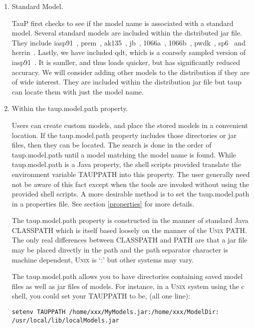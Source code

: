 \begin{enumerate}
\item Standard Model.

TauP first checks to see if the model name is associated with a standard model.
Several standard models are included within the distributed jar file. 
They include 
iasp91~\cite{iasp}, 
prem~\cite{dziewonski_anderson}, 
ak135~\cite{kennett:ak135}, 
jb~\cite{jb}, 
1066a~\cite{gilbert_dziewonski}, 
1066b~\cite{gilbert_dziewonski}, 
pwdk~\cite{weber_davis}, 
sp6~\cite{morelli} and 
herrin~\cite{herrin}. Lastly, we have included qdt, which is a coarsely sampled version of iasp91~\cite{iasp}. It is samller, and thus loads quicker, but has significantly reduced accuracy.
We will consider adding other models to the distribution if
they are of wide interest. 
They are included within the distribution jar file but
taup can locate them with just the model name.

\item Within the taup.model.path property.

Users can create custom models, and place the stored models in a convenient 
location. If the taup.model.path property includes those 
directories or jar files, then they can be located. 
The search is done in the order of taup.model.path until a model matching the model
name is found. While taup.model.path is a Java property, the shell scripts provided 
translate the environment variable TAUPPATH into this property. The user 
generally need not be aware of this fact except when the tools are invoked 
without using the provided shell scripts. A more desirable method is to
set the taup.model.path in a properties file. See section \ref{properties} for
more details.

The taup.model.path property is constructed in the manner of standard Java CLASSPATH
which is itself based loosely on the manner of the \textsc{Unix} PATH. 
The only real
differences between CLASSPATH and PATH are that a jar file 
may be placed directly in the path and the path separator character 
is machine dependent, \textsc{Unix} is `:' but other systems may vary.

The taup.model.path allows you to have directories containing saved model files 
as well as jar files of models. 
For instance, in a \textsc{Unix} system using the c shell, 
you could set your TAUPPATH to be, (all one line):

\begin{verbatim}
setenv TAUPPATH /home/xxx/MyModels.jar:/home/xxx/ModelDir: 
/usr/local/lib/localModels.jar
\end{verbatim}


\end{enumerate}
